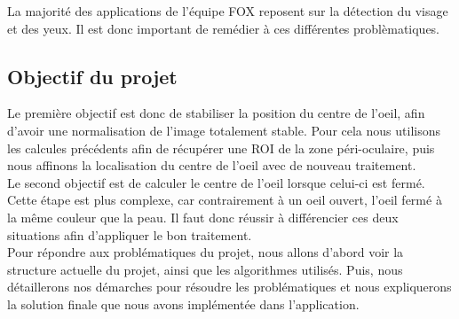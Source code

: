 La majorité des applications de l'équipe FOX reposent sur la détection du visage et des yeux. Il est donc 
important de remédier à ces différentes problèmatiques.\\

\subsection{Objectif du projet}

Le première objectif est donc de stabiliser la position du centre de l'oeil, afin d'avoir une normalisation de l'image
totalement stable. Pour cela nous utilisons les calcules précédents afin de récupérer une ROI de la zone péri-oculaire, puis
nous affinons la localisation du centre de l'oeil avec de nouveau traitement.\\

Le second objectif est de calculer le centre de l'oeil lorsque celui-ci est fermé. Cette étape est plus complexe,
car contrairement à un oeil ouvert, l'oeil fermé à la même couleur que la peau. Il faut donc réussir à différencier ces
deux situations afin d'appliquer le bon traitement.\\ 

Pour répondre aux problématiques du projet, nous allons d'abord voir la structure actuelle du projet, ainsi que les algorithmes
utilisés. Puis, nous détaillerons nos démarches pour résoudre les problématiques et nous expliquerons la solution finale que nous avons
implémentée dans l'application.\\

\newpage
